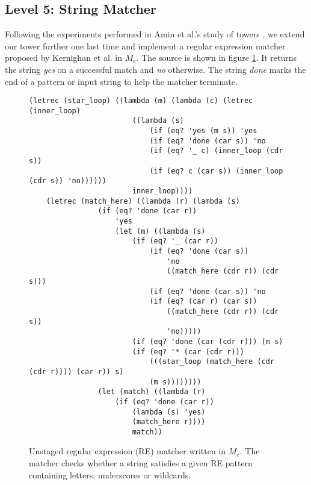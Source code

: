 \documentclass[a4paper,12pt,twoside,openright]{report}
\theoremstyle{definition}
\newcommand{\ts}{\textquotesingle}
\newcommand{\mevl}{$M_{e}$}
\begin{document}

\subsection{Level 5: String Matcher}\label{sec:string_matcher}

Following the experiments performed in Amin et al.'s study of towers \cite{amin2017collapsing}, we extend our tower further one last time and implement a regular expression matcher proposed by Kernighan et al. \cite{kernighan2007regular} in \mevl. The source is shown in figure \ref{lst:regexp}. It returns the string \textit{{\ts}yes} on a successful match and \textit{{\ts}no} otherwise. The string \textit{done} marks the end of a pattern or input string to help the matcher terminate.

\begin{figure}[htp!]
    \centering
    \begin{verbatim}
(letrec (star_loop) ((lambda (m) (lambda (c) (letrec (inner_loop)
                        ((lambda (s)
                            (if (eq? 'yes (m s)) 'yes
                            (if (eq? 'done (car s)) 'no
                            (if (eq? '_ c) (inner_loop (cdr s))
                            (if (eq? c (car s)) (inner_loop (cdr s)) 'no))))))
                        inner_loop))))
    (letrec (match_here) ((lambda (r) (lambda (s)
                (if (eq? 'done (car r))
                    'yes
                    (let (m) ((lambda (s)
                        (if (eq? '_ (car r))
                            (if (eq? 'done (car s))
                                'no
                                ((match_here (cdr r)) (cdr s)))
                            (if (eq? 'done (car s)) 'no
                            (if (eq? (car r) (car s))
                                ((match_here (cdr r)) (cdr s))
                                'no)))))
                        (if (eq? 'done (car (cdr r))) (m s)
                        (if (eq? '* (car (cdr r)))
                            (((star_loop (match_here (cdr (cdr r)))) (car r)) s)
                            (m s))))))))
                (let (match) ((lambda (r)
                    (if (eq? 'done (car r))
                        (lambda (s) 'yes)
                        (match_here r))))
                        match))
    \end{verbatim}
    \caption{Unstaged regular expression (RE) matcher written in \mevl. The matcher checks whether a string satisfies a given RE pattern containing letters, underscores or wildcards.}
    \label{lst:regexp}
\end{figure}
\end{document}
